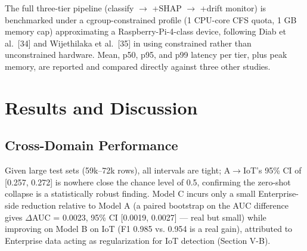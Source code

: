 \documentclass[conference]{IEEEtran}
\begin{document}
The full three-tier pipeline (classify $\rightarrow$ +SHAP $\rightarrow$ +drift monitor) is benchmarked under a cgroup-constrained profile (1 CPU-core CFS quota, 1 GB memory cap) approximating a Raspberry-Pi-4-class device, following Diab et al.~[34] and Wijethilaka et al.~[35] in using constrained rather than unconstrained hardware. Mean, p50, p95, and p99 latency per tier, plus peak memory, are reported and compared directly against three other studies.

\section{Results and Discussion}

\subsection{Cross-Domain Performance}

\begin{table}[htbp]
\caption{Cross-domain AUC/F1, with 95\% bootstrap CI}
\begin{center}
\footnotesize
{}
\label{tab1}
\end{center}
\end{table}

Given large test sets (59k--72k rows), all intervals are tight; A$\rightarrow$IoT's 95\% CI of [0.257, 0.272] is nowhere close the chance level of 0.5, confirming the zero-shot collapse is a statistically robust finding. Model C incurs only a small Enterprise-side reduction relative to Model A (a paired bootstrap on the AUC difference gives $\Delta$AUC = 0.0023, 95\% CI [0.0019, 0.0027] --- real but small) while improving on Model B on IoT (F1 0.985 vs. 0.954 is a real gain), attributed to Enterprise data acting as regularization for IoT detection (Section V-B).
\end{document}

